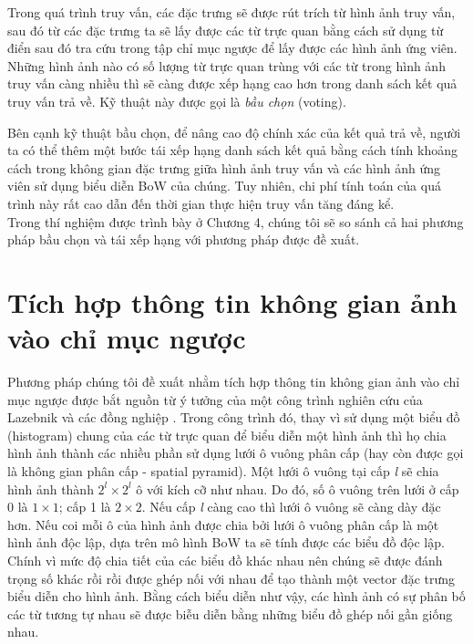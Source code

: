 Trong quá trình truy vấn, các đặc trưng sẽ được rút trích từ hình ảnh truy vấn, sau đó từ các đặc trưng ta sẽ lấy được các từ trực quan bằng cách sử dụng từ điển sau đó tra cứu trong tập chỉ mục ngược để lấy được các hình ảnh ứng viên. Những hình ảnh nào có số lượng từ trực quan trùng với các từ trong hình ảnh truy vấn càng nhiều thì sẽ càng được xếp hạng cao hơn trong danh sách kết quả truy vấn trả về. Kỹ thuật này được gọi là \textit{bầu chọn} (voting).

Bên cạnh kỹ thuật bầu chọn, để nâng cao độ chính xác của kết quả trả về, người ta có thể thêm một bước tái xếp hạng danh sách kết quả bằng cách tính khoảng cách trong không gian đặc trưng giữa hình ảnh truy vấn và các hình ảnh ứng viên sử dụng biểu diễn BoW của chúng. Tuy nhiên, chi phí tính toán của quá trình này rất cao dẫn đến thời gian thực hiện truy vấn tăng đáng kể.\\

Trong thí nghiệm được trình bày ở Chương 4, chúng tôi sẽ so sánh cả hai phương pháp bầu chọn và tái xếp hạng với phương pháp được đề xuất.\\

\section{Tích hợp thông tin không gian ảnh vào chỉ mục ngược}
\label{sec:intergrated}
Phương pháp chúng tôi đề xuất nhằm tích hợp thông tin không gian ảnh vào chỉ mục ngược được bắt nguồn từ ý tưởng của một công trình nghiên cứu của Lazebnik và các đồng nghiệp \cite{lazebnik2006beyond}. Trong công trình đó, thay vì sử dụng một biểu đồ (histogram) chung  của các từ trực quan để biểu diễn một hình ảnh thì họ chia hình ảnh thành các nhiều phần sử dụng lưới ô vuông phân cấp (hay còn được gọi là không gian phân cấp - spatial pyramid). Một lưới ô vuông tại cấp \textit{l} sẽ chia hình ảnh thành $2^l \times 2^l$ ô với kích cỡ như nhau. Do đó, số ô vuông trên lưới ở cấp 0 là $1 \times 1$; cấp 1 là $2 \times 2$. Nếu cấp \textit{l} càng cao thì lưới ô vuông sẽ càng dày đặc hơn. Nếu coi mỗi ô của hình ảnh được chia bởi lưới ô vuông phân cấp là một hình ảnh độc lập, dựa trên mô hình BoW ta sẽ tính được các biểu đồ độc lập. Chính vì mức độ chia tiết của các biểu đồ khác nhau nên chúng sẽ được đánh trọng số khác rồi rồi được ghép nối với nhau để tạo thành một vector đặc trưng biểu diễn cho hình ảnh. Bằng cách biểu diễn như vậy, các hình ảnh có sự phân bố các từ tương tự nhau sẽ được biễu diễn bằng những biểu đồ ghép nối gần giống nhau.

